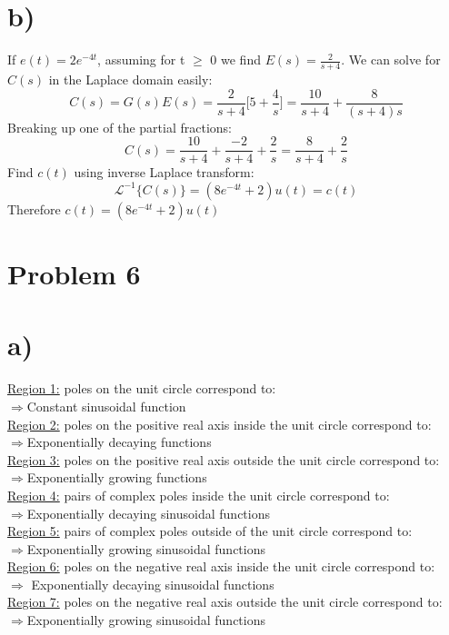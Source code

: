 \documentclass[12pt,letterpaper]{article}
\begin{document}
\section*{b)}
If $ e(t) = 2e^{-4t}$, assuming for t $\geq$ 0 we find $E(s) = \frac{2}{s+4}$. We can solve for $C(s)$ in the Laplace domain easily:
\begin{equation}
C(s) = G(s)E(s) = \frac{2}{s+4}\bigg[5 + \frac{4}{s}\bigg] = \frac{10}{s+4} + \frac{8}{(s+4)s}
\end{equation}
Breaking up one of the partial fractions:
\begin{equation}
C(s) = \frac{10}{s+4} + \frac{-2}{s+4} + \frac{2}{s} = \frac{8}{s+4} + \frac{2}{s}
\end{equation}
Find $c(t)$ using inverse Laplace transform:
\begin{equation}
\mathcal{L}^{-1}\{C(s)\} = (8e^{-4t} + 2)u(t)  = c(t)
\end{equation}
Therefore $c(t) = (8e^{-4t} + 2)u(t)$ \pagebreak
\section{Problem 6}
\section*{a)}
\underline{Region 1:} poles	on the	unit	circle	correspond	to:\\
$\Rightarrow$Constant sinusoidal function \\
\underline{Region 2:} poles on the positive real axis inside the unit circle correspond to:\\ $\Rightarrow$Exponentially decaying functions\\
\underline{Region 3:} poles on the positive real axis outside the unit circle correspond to:\\ $\Rightarrow$Exponentially growing functions\\
\underline{Region 4:} pairs of complex poles inside the unit circle correspond to:\\
$\Rightarrow$Exponentially decaying sinusoidal functions\\
\underline{Region 5:} pairs of complex poles outside of the unit circle correspond to:\\
$\Rightarrow$Exponentially growing sinusoidal functions\\
\underline{Region 6:} poles on the negative real axis inside the unit circle correspond to:\\$\Rightarrow$ Exponentially decaying sinusoidal functions\\
\underline{Region 7:} poles on the negative real axis outside the unit circle correspond to:\\
$\Rightarrow$Exponentially growing sinusoidal functions\\
\end{document}

